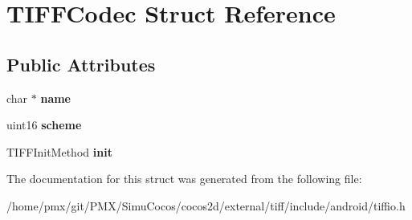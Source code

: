 \hypertarget{structTIFFCodec}{}\section{T\+I\+F\+F\+Codec Struct Reference}
\label{structTIFFCodec}
\subsection*{Public Attributes}
\begin{DoxyCompactItemize}
\item 
\mbox{\label{structTIFFCodec_a1a2e3c8aaf9880596ccc2da2811296fb}} 
char $\ast$ {\bfseries name}
\item 
\mbox{\label{structTIFFCodec_a676e638ab8f54c903801cd2572cbbf01}} 
uint16 {\bfseries scheme}
\item 
\mbox{\label{structTIFFCodec_a6a9741e4d83a2d4f16142fdba9878271}} 
T\+I\+F\+F\+Init\+Method {\bfseries init}
\end{DoxyCompactItemize}


The documentation for this struct was generated from the following file\+:\begin{DoxyCompactItemize}
\item 
/home/pmx/git/\+P\+M\+X/\+Simu\+Cocos/cocos2d/external/tiff/include/android/tiffio.\+h\end{DoxyCompactItemize}
